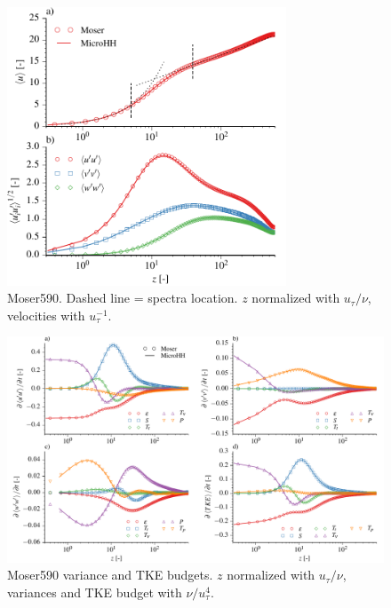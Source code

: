\documentclass[gmd]{copernicus}
\begin{document}
\begin{figure}[t]
\vspace*{2mm}
\begin{center}
\includegraphics[width=8.3cm]{figs/gmd_m590_umean_var.pdf}
\end{center}
\caption{Moser590. Dashed line = spectra location. $z$ normalized with $u_\tau / \nu$, velocities with $u_\tau^{-1}$.}
\end{figure}

\begin{figure}[t]
\vspace*{2mm}
\begin{center}
\includegraphics[width=16.6cm]{figs/gmd_m590_turb_budg.pdf}
\end{center}
\caption{Moser590 variance and TKE budgets. $z$ normalized with $u_\tau / \nu$, variances and TKE budget with $\nu / u_\tau^{4}$.}
\end{figure}
\end{document}
